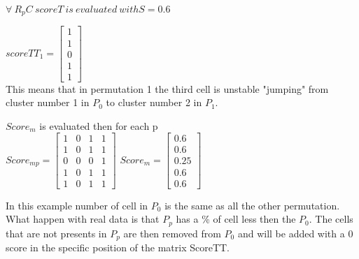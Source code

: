 \documentclass[12pt]{article}
\begin{document}
$ \forall \ R_pC \ scoreT \ is \ evaluated \ with S=0.6$

$ scoreTT_1=\begin{bmatrix}
1 \\
1 \\
0 \\
1 \\
1 
\end{bmatrix}  $
\\ This means that in permutation 1 the third cell is unstable "jumping" from cluster number 1 in $P_0$ to cluster number 2 in $P_1$.

$Score_m$ is evaluated then for each p\\ 

$ Score_{mp}=\begin{bmatrix}
1 & 0 & 1 & 1 \\
1 & 0 & 1 & 1 \\
0 & 0 & 0 & 1 \\
1 & 0 & 1 & 1 \\
1 & 0 & 1 & 1 
\end{bmatrix}  $
$ Score_m=\begin{bmatrix}
0.6 \\
0.6 \\
0.25 \\
0.6 \\
0.6 
\end{bmatrix}  $

In this example number of cell in $P_0$ is the same as all the other permutation. What happen with real data is that $P_p$ has a \% of cell less then the $P_0$. The cells that are not presents in $P_p$ are then removed from $P_0$ and will be added with a 0 score in the specific position of the matrix ScoreTT. 


\end{document}

